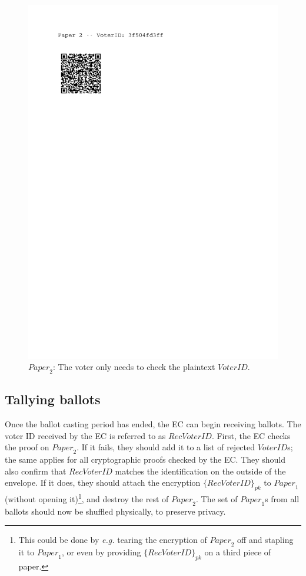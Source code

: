 \documentclass[12pt,a4paper]{article}
\theoremstyle{definition}
\newcommand{\VoterID}{\mathit{VoterID}}
\newcommand{\receivedvid}{\mathit{RecVoterID}}
\newcommand{\Paper}{\mathit{Paper}}
\newcommand{\eg}{\textit{e.g. }}
\begin{document}
\begin{figure}
	\includegraphics[scale=0.6, trim=0cm 22cm 4cm 0cm, clip=true]{paper2.pdf}
	\caption{$\Paper_2$: The voter only needs to check the plaintext $\VoterID$.}
		\label{fig:paper2}
\end{figure}


\subsection{Tallying ballots}
Once the ballot casting period has ended, the EC can begin receiving ballots. The voter ID received by the EC is referred to as $\receivedvid$. First, the EC checks the proof on $\Paper_2$. If it fails, they should add it to a list of rejected $\VoterID$s; the same applies for all cryptographic proofs checked by the EC.
They should also confirm that $\receivedvid$ matches the identification on the outside of the envelope. If it does, they should attach the encryption $\{\receivedvid\}_{pk}$ to $\Paper_1$ (without opening it)\footnote{This could be done by \eg tearing the encryption of $\Paper_2$ off and stapling it to $\Paper_1$, or even by providing $\{\receivedvid\}_{pk}$ on a third piece of paper.}, and destroy the rest of $\Paper_2$. The set of $\Paper_1$s from all ballots should now be shuffled physically, to preserve privacy.
\end{document}
